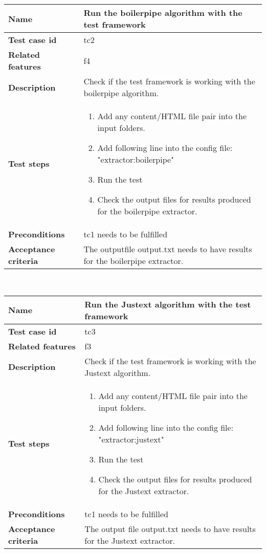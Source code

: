 	\begin{tabular}{ | p{3.5cm} | p{12cm} |}
	\hline
	\textbf{Name} 					&  Run the boilerpipe algorithm with the test framework\\ 	\hline
	\textbf{Test case id} 			& tc2 						\\ 	\hline
	\textbf{Related features}		& f4 						\\ 	\hline
	\textbf{Description} 			& Check if the test framework is working with the boilerpipe algorithm.	\\ 	\hline
	\textbf{Test steps} 			& 	\begin{enumerate}
											\item{Add any content/HTML file pair into the input folders.}
											\item{Add following line into the config file: "extractor:boilerpipe"}
											\item{Run the test}
											\item{Check the output files for results produced for the boilerpipe extractor.}
										\end{enumerate}
																\\ 	\hline
	\textbf{Preconditions} 			& tc1 needs to be fulfilled 							\\ 	\hline
	\textbf{Acceptance criteria} 	& The outputfile output.txt needs to have results for the boilerpipe extractor.\\ 	\hline
	\end{tabular} \\



	\begin{tabular}{ | p{3.5cm} | p{12cm} |}
	\hline
	\textbf{Name} 					&  Run the Justext algorithm with the test framework\\ 	\hline
	\textbf{Test case id} 			& tc3 						\\ 	\hline
	\textbf{Related features}		& f3						\\ 	\hline
	\textbf{Description} 			& Check if the test framework is working with the Justext algorithm.	\\ 	\hline
	\textbf{Test steps} 			& 	\begin{enumerate}
											\item{Add any content/HTML file pair into the input folders.}
											\item{Add following line into the config file: "extractor:justext"}
											\item{Run the test}
											\item{Check the output files for results produced for the Justext extractor.}
										\end{enumerate}
																\\ 	\hline
	\textbf{Preconditions} 			& tc1 needs to be fulfilled							\\ 	\hline
	\textbf{Acceptance criteria} 	& The output file output.txt needs to have results for the Justext extractor.\\ 	\hline
	\end{tabular} \\

